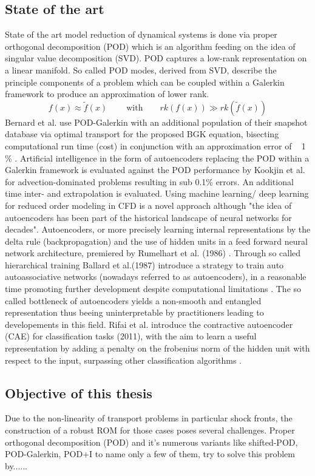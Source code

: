 \documentclass[12pt, a4paper]{article}
\begin{document}
\subsection{State of the art}
State of the art model reduction of dynamical systems is done via proper orthogonal decomposition (POD) which is an algorithm feeding on the idea of singular value decomposition (SVD)\cite{Franz}\cite{Kutz}. POD captures a low-rank representation on a linear manifold. So called POD modes, derived from SVD, describe the principle components of a problem which can be coupled within a Galerkin framework to produce an approximation of lower rank. 
\begin{equation}
	f(x)\approx \tilde{f}(x) \qquad\ \textrm{with}\qquad rk(f(x)) \gg rk(\tilde{f}(x))
\end{equation}
Bernard et al. use POD-Galerkin with an additional population of their snapshot database via optimal transport for the proposed BGK equation, bisecting computational run time (cost) in conjunction with an approximation error of ~ 1 \% \cite{Bernard}. Artificial intelligence in the form of autoencoders replacing the POD within a Galerkin framework is evaluated against the POD performance by Kookjin et al. for advection-dominated problems\cite{Carlberg} resulting in sub 0.1\% errors. An additional time inter- and extrapolation is evaluated. Using machine learning/ deep learning for reduced order modeling in CFD is a novel approach although "the idea of autoencoders has been part of the historical landscape of neural networks for decades"\cite[p.493]{Goodfellow}. Autoencoders, or more precisely learning internal representations by the delta rule (backpropagation) and the use of hidden units in a feed forward neural network architecture, premiered by Rumelhart et al. (1986) \cite{Rumelhart}.  Through so called hierarchical training Ballard et al.(1987) introduce a strategy to train auto autoassociative networks (nowadays referred to as autoencoders), in a reasonable time promoting further development despite computational limitations \cite{Ballard}. The so called bottleneck of autoencoders yields a non-smooth and entangled representation thus beeing uninterpretable by practitioners\cite{Rifai2011} leading to developements in this field. Rifai et al. introduce the contractive autoencoder (CAE) for classification tasks (2011), with the aim to learn a useful representation by adding a penalty on the frobenius norm of the hidden unit with respect to the input, surpassing other classification algorithms \cite{Rifai2011}. 
\subsection{Objective of this thesis}
Due to the non-linearity of transport problems in particular shock fronts, the construction of a robust ROM for those cases poses several challenges. Proper orthogonal decomposition (POD) and it's numerous variants like shifted-POD\cite{bibid}, POD-Galerkin\cite{bibid}, POD+I \cite{bibid} to name only a few of them, try to solve this problem by......
\end{document}
